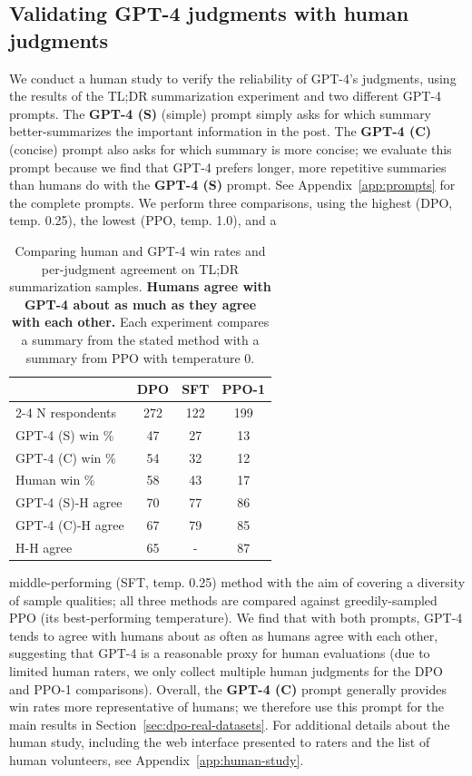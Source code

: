 \documentclass{article}
\begin{document}
\subsection{Validating GPT-4 judgments with human judgments}
\label{sec:human-judgments}
We conduct a human study to verify the reliability of GPT-4's judgments, using the results of the TL;DR summarization experiment and two different GPT-4 prompts. The \textbf{GPT-4 (S)} (simple) prompt simply asks for which summary better-summarizes the important information in the post. The \textbf{GPT-4 (C)} (concise) prompt also asks for which summary is more concise; we evaluate this prompt because we find that GPT-4 prefers longer, more repetitive summaries than humans do with the \textbf{GPT-4 (S)} prompt. See Appendix~\ref{app:prompts} for the complete prompts. We perform three comparisons, using the highest (DPO, temp. 0.25), the lowest (PPO, temp. 1.0), and a \begin{table}
    \centering
    \small
    \vspace{-1.5mm}
    \begin{tabular}{lccc}
    \toprule
        & \textbf{DPO} & \textbf{SFT} & \textbf{PPO-1} \\
        \cmidrule(lr){2-4}
        N respondents & 272 & 122 & 199 \\
        \midrule
        GPT-4 (S) win \% & 47 & 27 & 13 \\
        GPT-4 (C) win \% & 54 & 32 & 12 \\
        Human win \% & 58 & 43 & 17 \\
        \midrule
        GPT-4 (S)-H agree & 70 & 77 & 86 \\
        GPT-4 (C)-H agree & 67 & 79 & 85 \\
        H-H agree & 65 & - & 87 \\
        \bottomrule
    \end{tabular}
    \vspace{-1mm}
    \caption{Comparing human and GPT-4 win rates and per-judgment agreement on TL;DR summarization samples. \textbf{Humans agree with GPT-4 about as much as they agree with each other.} Each experiment compares a summary from the stated method with a summary from PPO with temperature 0.}
    \vspace{-5mm}
    \label{tab:human_results}
\end{table}middle-performing (SFT, temp. 0.25) method with the aim of covering a diversity of sample qualities; all three methods are compared against greedily-sampled PPO (its best-performing temperature). We find that with both prompts, GPT-4 tends to agree with humans about as often as humans agree with each other, suggesting that GPT-4 is a reasonable proxy for human evaluations (due to limited human raters, we only collect multiple human judgments for the DPO and PPO-1 comparisons). Overall, the \textbf{GPT-4 (C)} prompt generally provides win rates more representative of humans; we therefore use this prompt for the main results in Section~\ref{sec:dpo-real-datasets}. For additional details about the human study, including the web interface presented to raters and the list of human volunteers, see Appendix~\ref{app:human-study}.
\end{document}
